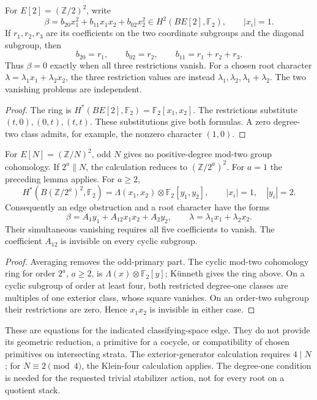 \begin{lemma}
\label{lem:G-Klein-four}
For \(E[2]=(\mathbb Z/2)^2\), write
\[
 \beta=b_{20}x_1^2+b_{11}x_1x_2+b_{02}x_2^2
       \in H^2(BE[2],\mathbb F_2),\qquad |x_i|=1.
\]
If \(r_1,r_2,r_3\) are its coefficients on the two coordinate
subgroups and the diagonal subgroup, then
\[
 b_{20}=r_1,\qquad b_{02}=r_2,\qquad
 b_{11}=r_1+r_2+r_3.
\]
Thus \(\beta=0\) exactly when all three restrictions vanish.
For a chosen root character
\(\lambda=\lambda_1x_1+\lambda_2x_2\), the three restriction
values are instead \(\lambda_1,\lambda_2,\lambda_1+\lambda_2\).
The two vanishing problems are independent.
\end{lemma}
\begin{proof}
The ring is \(H^*(BE[2],\mathbb F_2)=\mathbb F_2[x_1,x_2]\).
The restrictions substitute \((t,0),(0,t),(t,t)\).
These substitutions give both formulas. A zero degree-two class
admits, for example, the nonzero character \((1,0)\).
\end{proof}

\begin{lemma}
\label{lem:G-two-primary-stabilizer}
For \(E[N]=(\mathbb Z/N)^2\), odd \(N\) gives no
positive-degree mod-two group cohomology. If \(2^a\parallel N\),
the calculation reduces to \((\mathbb Z/2^a)^2\).
For \(a=1\) the preceding lemma applies. For \(a\ge2\),
\[
 H^*(B(\mathbb Z/2^a)^2,\mathbb F_2)
 =\Lambda(x_1,x_2)\otimes\mathbb F_2[y_1,y_2],
 \qquad |x_i|=1,\quad |y_i|=2.
\]
Consequently an edge obstruction and a root character have the forms
\[
 \beta=A_1y_1+A_{12}x_1x_2+A_2y_2,
 \qquad \lambda=\lambda_1x_1+\lambda_2x_2.
\]
Their simultaneous vanishing requires all five coefficients to
vanish. The coefficient \(A_{12}\) is invisible on every cyclic
subgroup.
\end{lemma}
\begin{proof}
Averaging removes the odd-primary part. The cyclic mod-two
cohomology ring for order \(2^a\), \(a\ge2\), is
\(\Lambda(x)\otimes\mathbb F_2[y]\); K\"unneth gives the ring
above. On a cyclic subgroup of order at least four, both
restricted degree-one classes are multiples of one exterior class,
whose square vanishes. On an order-two subgroup their restrictions
are zero. Hence \(x_1x_2\) is invisible in either case.
\end{proof}

\begin{remark}
\label{rem:G-N-2-vs-N-3}
These are equations for the indicated classifying-space edge.
They do not provide its geometric reduction, a primitive for a
cocycle, or compatibility of chosen primitives on intersecting
strata. The exterior-generator calculation requires \(4\mid N\);
for \(N\equiv2\pmod4\), the Klein-four calculation applies.
The degree-one condition is needed for the requested trivial
stabilizer action, not for every root on a quotient stack.
\end{remark}

